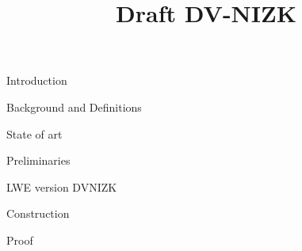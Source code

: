



\pagestyle{plain}

\title{Draft DV-NIZK}

\maketitle

\begin{section}{Introduction}

\end{section}

\begin{section}{Background and Definitions}

\end{section}

\begin{section}{State of art}

\end{section}

\begin{section}{Preliminaries}

\end{section}

\begin{section}{LWE version DVNIZK}

\end{section}

\begin{section}{Construction}

\end{section}

\begin{section}{Proof}

\end{section}










